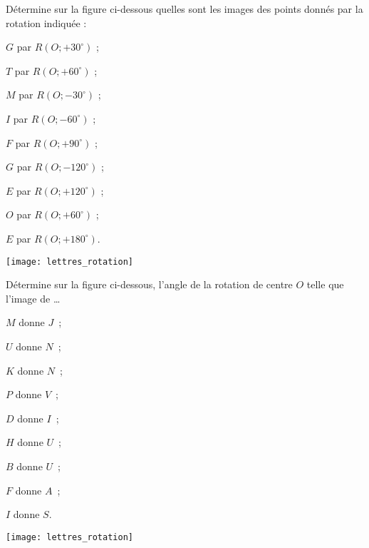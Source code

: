 

\begin{exercice}
Détermine sur la figure ci-dessous quelles sont les images des points donnés par la rotation indiquée :
\begin{colenumerate}{2}
 \item $G$ par $R(O ; + 30^\circ)$ ;
 \item $T$ par $R(O ; + 60^\circ)$ ;
 \item $M$ par $R(O ; - 30^\circ)$ ;
 \item $I$ par $R(O ; - 60^\circ)$ ;
 \item $F$ par $R(O ; + 90^\circ)$ ;
 \item $G$ par $R(O ; - 120^\circ)$ ;
 \item $E$ par $R(O; + 120^\circ)$ ;
 \item $O$ par $R(O ; + 60^\circ)$ ;
 \item $E$ par $R(O ; + 180^\circ)$.
 \end{colenumerate}
\begin{center} \texttt{[image: lettres\_rotation]} \end{center}
\end{exercice}


\vspace{-2.5cm}
\begin{exercice}
Détermine sur la figure ci-dessous, l'angle de la rotation de centre $O$ telle que l'image de \ldots
\begin{colenumerate}{3}
 \item $M$ donne $J$ ;
 \item $U$ donne $N$ ;
 \item $K$ donne $N$ ;
 \item $P$ donne $V$ ;
 \item $D$ donne $I$ ;
 \item $H$ donne $U$ ;
 \item $B$ donne $U$ ;
 \item $F$ donne $A$ ;
 \item $I$ donne $S$.
 \end{colenumerate}
\begin{center} \texttt{[image: lettres\_rotation]} \end{center}
\end{exercice}


